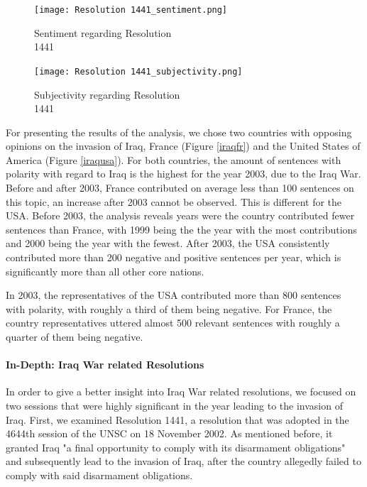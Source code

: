 \begin{figure}[t!]
    \centering
    \begin{minipage}{0.47\textwidth}
        \centering
        \texttt{[image: Resolution 1441\_sentiment.png]} %
        \caption{Sentiment regarding Resolution \\ 1441}
        \label{1441sent}
    \end{minipage}\hfill
    \begin{minipage}{0.47\textwidth}
        \centering
        \texttt{[image: Resolution 1441\_subjectivity.png]} %
        \caption{Subjectivity regarding Resolution \\ 1441}
        \label{1441subj}
    \end{minipage}
\end{figure}

For presenting the results of the analysis, we chose two countries with opposing opinions on the invasion of Iraq, France (Figure \ref{iraqfr}) and the United States of America (Figure \ref{iraqusa}).
For both countries, the amount of sentences with polarity with regard to Iraq is the highest for the year 2003, due to the Iraq War. Before and after 2003, France contributed on average less than 100 sentences on this topic, an increase after 2003 cannot be observed. This is different for the USA. Before 2003, the analysis reveals years were the country contributed fewer sentences than France, with 1999 being the the year with the most contributions and 2000 being the year with the fewest. After 2003, the USA consistently contributed more than 200 negative and positive sentences per year, which is significantly more than all other core nations.

In 2003, the representatives of the USA contributed more than 800 sentences with polarity, with roughly a third of them being negative. 
For France, the country representatives uttered almost 500 relevant sentences with roughly a quarter of them being negative.

\paragraph{In-Depth: Iraq War related Resolutions}
In order to give a better insight into Iraq War related resolutions, we focused on two sessions that were highly significant in the year leading to the invasion of Iraq. First, we examined Resolution 1441, a resolution that was adopted in the 4644th session of the UNSC on 18 November 2002. As mentioned before, it granted Iraq "a final opportunity to comply with its disarmament obligations" \citep{resolution1441} and subsequently lead to the invasion of Iraq, after the country allegedly failed to comply with said disarmament obligations.


